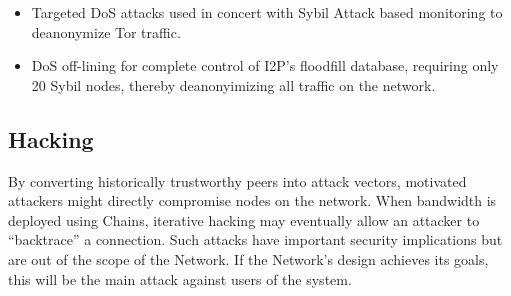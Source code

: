 \begin{itemize}
\item Targeted DoS attacks used in concert with Sybil Attack based monitoring to deanonymize Tor traffic\cite{DOSvsSec}.
\item DoS off-lining for complete control of I2P’s floodfill database, requiring only 20 Sybil nodes, thereby deanonyimizing all traffic on the network\cite{I2P-vigna}.
\end{itemize}

\subsection*{Hacking}

By converting historically trustworthy peers into attack vectors, motivated attackers might directly compromise nodes on the network. When bandwidth is deployed using Chains, iterative hacking may eventually allow an attacker to ``backtrace'' a connection. Such attacks have important security implications but are out of the scope of the \Orchid{} Network. If the \Orchid{} Network's design achieves its goals, this will be the main attack against users of the system.
